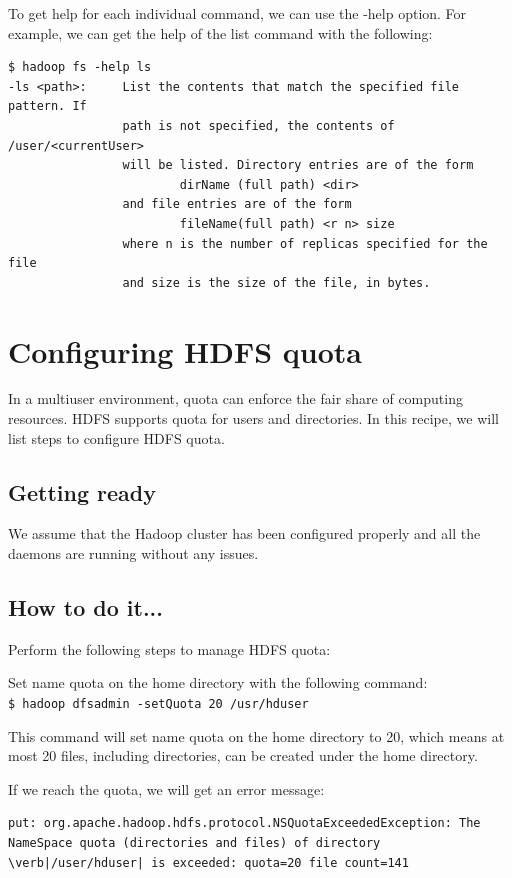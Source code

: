To get help for each individual command, we can use the -help option. For example, we can get the help of the list command with the following:
\lstset{style=bashstyle}
\begin{lstlisting}
$ hadoop fs -help ls
-ls <path>:     List the contents that match the specified file pattern. If
                path is not specified, the contents of /user/<currentUser>
                will be listed. Directory entries are of the form
                        dirName (full path) <dir>
                and file entries are of the form
                        fileName(full path) <r n> size
                where n is the number of replicas specified for the file
                and size is the size of the file, in bytes.
\end{lstlisting}
\section{Configuring HDFS quota}
In a multiuser environment, quota can enforce the fair share of computing resources. HDFS supports quota for users and directories. In this recipe, we will list steps to configure HDFS quota.

\subsection*{Getting ready}
We assume that the Hadoop cluster has been configured properly and all the daemons are running without any issues.

\subsection*{How to do it...}
Perform the following steps to manage HDFS quota:

Set name quota on the home directory with the following command: \\
\verb|$ hadoop dfsadmin -setQuota 20 /usr/hduser|

This command will set name quota on the home directory to 20, which means at most 20 files, including directories, can be created under the home directory. 

If we reach the quota, we will get an error message: 
\lstset{style=bashstyle}
\begin{lstlisting}
put: org.apache.hadoop.hdfs.protocol.NSQuotaExceededException: The NameSpace quota (directories and files) of directory \verb|/user/hduser| is exceeded: quota=20 file count=141
\end{lstlisting}

